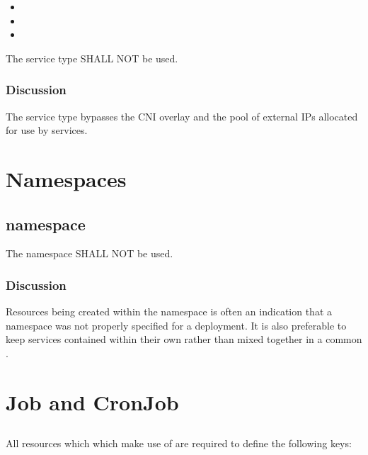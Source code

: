 \documentclass[PMO,authoryear,toc]{lsstdoc}
\begin{document}
\begin{itemize}
  \item {}
  \item {}
  \item {}
\end{itemize}

The  service type SHALL NOT be used.

\subsubsection{Discussion}

The  service type bypasses the CNI overlay and the pool of external IPs allocated for use by  services.

\section{Namespaces}\label{sec:ns}

\subsection{ namespace}

The  namespace SHALL NOT be used.

\subsubsection{Discussion}

Resources being created within the  namespace is often an indication that a namespace was not properly specified for a deployment. It is also preferable to keep services contained within their own  rather than mixed together in a common .

\section{Job and CronJob}\label{sec:job}

\subsection{}

All resources which which make use of \href{https://kubernetes.io/docs/reference/generated/kubernetes-api/v1.23/#jobspec-v1-batch}{} are required to define the following keys:
\end{document}
